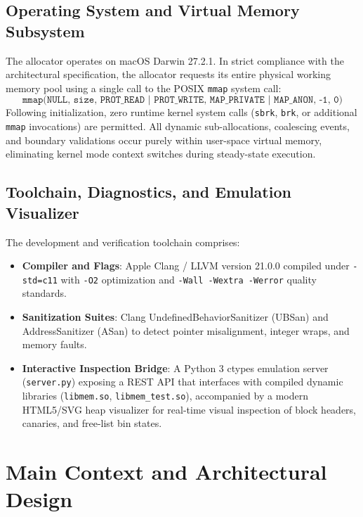 \documentclass[a4paper,11pt]{report}
\begin{document}
\section{Operating System and Virtual Memory Subsystem}
The allocator operates on macOS Darwin 27.2.1. In strict compliance with the architectural specification, the allocator requests its entire physical working memory pool using a single call to the POSIX \texttt{mmap} system call:
\begin{equation}
\texttt{mmap(NULL, size, PROT\_READ | PROT\_WRITE, MAP\_PRIVATE | MAP\_ANON, -1, 0)}
\end{equation}
Following initialization, zero runtime kernel system calls (\texttt{sbrk}, \texttt{brk}, or additional \texttt{mmap} invocations) are permitted. All dynamic sub-allocations, coalescing events, and boundary validations occur purely within user-space virtual memory, eliminating kernel mode context switches during steady-state execution.

\section{Toolchain, Diagnostics, and Emulation Visualizer}
The development and verification toolchain comprises:
\begin{itemize}
    \item \textbf{Compiler and Flags}: Apple Clang / LLVM version 21.0.0 compiled under \texttt{-std=c11} with \texttt{-O2} optimization and \texttt{-Wall -Wextra -Werror} quality standards.
    \item \textbf{Sanitization Suites}: Clang UndefinedBehaviorSanitizer (UBSan) and AddressSanitizer (ASan) to detect pointer misalignment, integer wraps, and memory faults.
    \item \textbf{Interactive Inspection Bridge}: A Python 3 ctypes emulation server (\texttt{server.py}) exposing a REST API that interfaces with compiled dynamic libraries (\texttt{libmem.so}, \texttt{libmem\_test.so}), accompanied by a modern HTML5/SVG heap visualizer for real-time visual inspection of block headers, canaries, and free-list bin states.
\end{itemize}

\chapter{Main Context and Architectural Design}
\label{chap:main_context}
\end{document}
